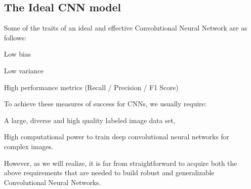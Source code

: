 	\subsection{The Ideal CNN model}
	\begin{bulletedlist}
		\item Some of the traits of an ideal and effective Convolutional Neural Network are as follows:
		\begin{bulletedlist}
			\item Low bias
			\item Low variance
			\item High performance metrics (Recall / Precision / F1 Score)
		\end{bulletedlist}
		\item To achieve these measures of success for CNNs, we usually require:
		\begin{bulletedlist}
			\item A large, diverse and high quality labeled image data set,
			\item High computational power to train deep convolutional neural networks for complex images.
		\end{bulletedlist}
		\item However, as we will realize, it is far from straightforward to acquire both the above requirements that are needed to build robust and generalizable Convolutional Neural Networks.
	\end{bulletedlist}

